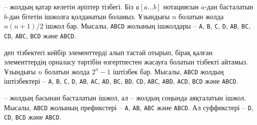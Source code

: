 

 -- жолдың қатар келетін әріптер тізбегі.
Біз $\texttt{s}[a \ldots b]$ нотациясын 
$a$-дан басталатын $b$-дан бітетін ішжолға 
қолданатын боламыз. Ұзындығы $n$ болатын 
жолда $n(n+1)/2$ ішжол бар. Мысалы, \texttt{ABCD} жолының
ішжолдары -- \texttt{A}, \texttt{B}, \texttt{C}, \texttt{D},
\texttt{AB}, \texttt{BC}, \texttt{CD},
\texttt{ABC}, \texttt{BCD} және \texttt{ABCD}.




 деп тізбектегі кейбір элементтерді алып тастай отырып, бірақ қалған элементтердің орналасу тәртібін өзгертпестен жасауға болатын тізбекті айтамыз. 
Ұзындығы $n$ болатын жолда $2^n-1$ іштізбек бар.
Мысалы, \texttt{ABCD} жолдың іштізбектері --
\texttt{A}, \texttt{B}, \texttt{C}, \texttt{D},
\texttt{AB}, \texttt{AC}, \texttt{AD},
\texttt{BC}, \texttt{BD}, \texttt{CD},
\texttt{ABC}, \texttt{ABD}, \texttt{ACD},
\texttt{BCD} және \texttt{ABCD}.



 -- жолдың басынан басталатын ішжол, ал 
 -- жолдың соңында аяқталатын ішжол. 
Мысалы, \texttt{ABCD} жолының префикстері --
\texttt{A}, \texttt{AB}, \texttt{ABC} және \texttt{ABCD}. Ал
суффикстері -- \texttt{D}, \texttt{CD}, \texttt{BCD} және \texttt{ABCD}.

